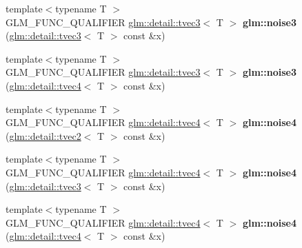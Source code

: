\begin{DoxyCompactItemize}
\item 
\hypertarget{namespaceglm_a40d0d9df93beb7d0c8b621a28ea59bd2}{}{\footnotesize template$<$typename T $>$ }\\G\+L\+M\+\_\+\+F\+U\+N\+C\+\_\+\+Q\+U\+A\+L\+I\+F\+I\+E\+R \hyperlink{structglm_1_1detail_1_1tvec3}{glm\+::detail\+::tvec3}$<$ T $>$ {\bfseries glm\+::noise3} (\hyperlink{structglm_1_1detail_1_1tvec3}{glm\+::detail\+::tvec3}$<$ T $>$ const \&x)\label{namespaceglm_a40d0d9df93beb7d0c8b621a28ea59bd2}

\item 
\hypertarget{namespaceglm_a9119e91ca516dcbf0e4788cb13f6cf25}{}{\footnotesize template$<$typename T $>$ }\\G\+L\+M\+\_\+\+F\+U\+N\+C\+\_\+\+Q\+U\+A\+L\+I\+F\+I\+E\+R \hyperlink{structglm_1_1detail_1_1tvec3}{glm\+::detail\+::tvec3}$<$ T $>$ {\bfseries glm\+::noise3} (\hyperlink{structglm_1_1detail_1_1tvec4}{glm\+::detail\+::tvec4}$<$ T $>$ const \&x)\label{namespaceglm_a9119e91ca516dcbf0e4788cb13f6cf25}

\item 
\hypertarget{namespaceglm_a5a9bee7392c533fb77629d57f30cddb9}{}{\footnotesize template$<$typename T $>$ }\\G\+L\+M\+\_\+\+F\+U\+N\+C\+\_\+\+Q\+U\+A\+L\+I\+F\+I\+E\+R \hyperlink{structglm_1_1detail_1_1tvec4}{glm\+::detail\+::tvec4}$<$ T $>$ {\bfseries glm\+::noise4} (\hyperlink{structglm_1_1detail_1_1tvec2}{glm\+::detail\+::tvec2}$<$ T $>$ const \&x)\label{namespaceglm_a5a9bee7392c533fb77629d57f30cddb9}

\item 
\hypertarget{namespaceglm_a6ab9ad0230446bf1a440b9c93186586d}{}{\footnotesize template$<$typename T $>$ }\\G\+L\+M\+\_\+\+F\+U\+N\+C\+\_\+\+Q\+U\+A\+L\+I\+F\+I\+E\+R \hyperlink{structglm_1_1detail_1_1tvec4}{glm\+::detail\+::tvec4}$<$ T $>$ {\bfseries glm\+::noise4} (\hyperlink{structglm_1_1detail_1_1tvec3}{glm\+::detail\+::tvec3}$<$ T $>$ const \&x)\label{namespaceglm_a6ab9ad0230446bf1a440b9c93186586d}

\item 
\hypertarget{namespaceglm_adcaee6089d990bbe782c20cea1ebe337}{}{\footnotesize template$<$typename T $>$ }\\G\+L\+M\+\_\+\+F\+U\+N\+C\+\_\+\+Q\+U\+A\+L\+I\+F\+I\+E\+R \hyperlink{structglm_1_1detail_1_1tvec4}{glm\+::detail\+::tvec4}$<$ T $>$ {\bfseries glm\+::noise4} (\hyperlink{structglm_1_1detail_1_1tvec4}{glm\+::detail\+::tvec4}$<$ T $>$ const \&x)\label{namespaceglm_adcaee6089d990bbe782c20cea1ebe337}

\end{DoxyCompactItemize}


